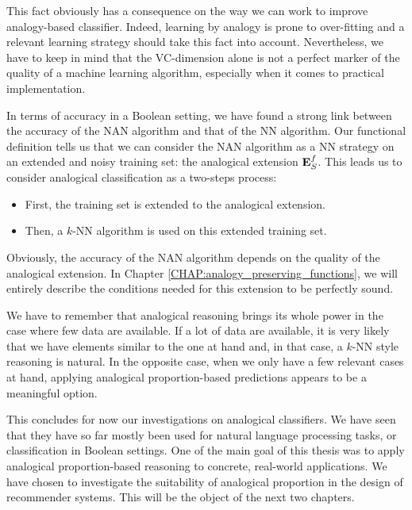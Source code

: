 This fact obviously has a consequence on the way we can
work to improve analogy-based classifier.  Indeed, learning by analogy is prone
to over-fitting and a relevant learning strategy should take this fact into
account.  Nevertheless, we have to keep in mind that the VC-dimension
alone is not a perfect marker of the quality of a machine learning algorithm,
especially when it comes to practical implementation.

In terms of accuracy in a Boolean setting, we have found a strong link between
the accuracy of the NAN algorithm and that of the NN algorithm. Our functional
definition tells us that we can consider the NAN algorithm as a NN strategy on an
extended and noisy training set: the analogical extension $\mathbf{E}_{S}^{f}$. This leads us
to consider analogical classification as a two-steps process:
\begin{itemize}
  \item First, the training set is extended to the analogical extension.
  \item Then, a $k$-NN algorithm is used on this extended training set.
\end{itemize}
Obviously, the accuracy of the NAN algorithm depends on the quality of the
analogical extension. In Chapter \ref{CHAP:analogy_preserving_functions}, we
will entirely describe the conditions needed for this extension to be perfectly
sound.

We have to remember that analogical reasoning brings its whole power in the
case where few data are available. If a lot of data are available, it is very
likely that we have elements similar to the one at hand and, in that case, a
$k$-NN style reasoning is natural. In the opposite case, when we only have a
few relevant cases at hand, applying analogical proportion-based predictions
appears to be a meaningful option.

This concludes for now our investigations on analogical classifiers. We have
seen that they have so far mostly been used for natural language processing
tasks, or classification in Boolean settings. One of the main goal of this
thesis was to apply analogical proportion-based reasoning to concrete,
real-world applications. We have chosen to investigate the suitability of
analogical proportion in the design of recommender systems. This will be the
object of the next two chapters.
